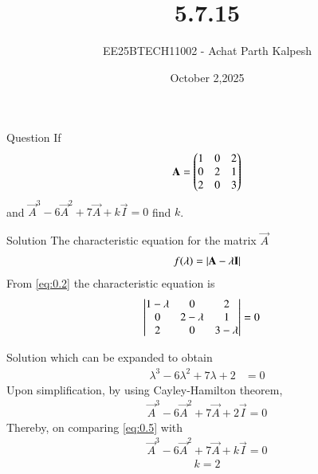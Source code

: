 \documentclass{beamer}
\title %
{5.7.15}
\date{October 2,2025}
\author %
{EE25BTECH11002 - Achat Parth Kalpesh}
\begin{document}
\frame{\titlepage}

\begin{frame}{Question}
If 
\begin{align}
\mathbf{A} = \begin{pmatrix}1 & 0 & 2 \\ 0 & 2 & 1 \\ 2 & 0 & 3\end{pmatrix}
\end{align} 
and $\vec{A}^3-6\vec{A}^2+7\vec{A}+k\vec{I}=0$ find $k$.
\end{frame}

\begin{frame}{Solution}
The characteristic equation for the matrix $\vec{A}$
\begin{align}
        f(\lambda) = \left\vert\mathbf{A} - \lambda \mathbf{I}\right\vert
        \label{eq:0.2}
\end{align}
From \eqref{eq:0.2} the characteristic equation is
\begin{align}
\begin{vmatrix}1 -\lambda & 0 & 2 \\ 0 & 2 -\lambda & 1 \\ 2 & 0 & 3-\lambda\end{vmatrix} &= 0
\end{align}   
\end{frame}

\begin{frame}{Solution}
which can be expanded to obtain
\begin{align} 
\lambda^3 - 6\lambda^2 + 7\lambda + 2 &= 0 
 \end{align} 
 Upon simplification, by using Cayley-Hamilton theorem,
 \begin{align}
     \vec{A}^3-6\vec{A}^2+7\vec{A}+2\vec{I}=0
     \label{eq:0.5}
 \end{align}
 Thereby, on comparing \eqref{eq:0.5} with
 \begin{align}
     \vec{A}^3-6\vec{A}^2+7\vec{A}+k\vec{I}=0
 \end{align}
 \begin{align}
     k=2
 \end{align}
\end{frame}
\end{document}
